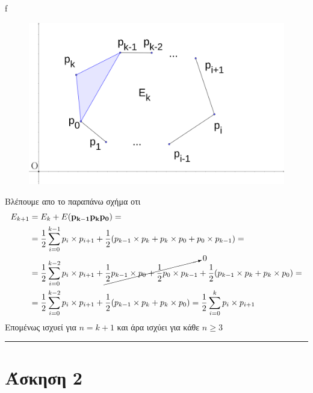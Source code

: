 f\documentclass[12pt]{article}
\begin{document}
\begin{figure}[H]

    \centering
    \includegraphics[scale = 1]{geogebra-export4.png}
\end{figure}
Βλέπουμε απο το παραπάνω σχήμα οτι 
\begin{align*}
    E_{k+1} &= E_k + E({\bf p_{k-1}p_{k}p_0}) =\\
    &=  \frac{1}{2}\sum_{i=0}^{k-1} p_i\times p_{i+1} + \frac{1}{2} (p_{k-1}\times p_{k} + p_{k}\times p_{0} + p_0\times p_{k-1}) = \\
    &=  \frac{1}{2}\sum_{i=0}^{k-2} p_i\times p_{i+1} + \cancelto{0}{\frac{1}{2}p_{k-1}\times p_{0}+ \frac{1}{2}p_0\times p_{k-1}}+\frac{1}{2} (p_{k-1}\times p_{k} + p_{k}\times p_{0} ) = \\
    &=  \frac{1}{2}\sum_{i=0}^{k-2} p_i\times p_{i+1}+\frac{1}{2} (p_{k-1}\times p_{k} + p_{k}\times p_{0} ) =\frac{1}{2}\sum_{i=0}^{k} p_i\times p_{i+1}
\end{align*}
Επομένως ισχυεί για $n=k+1$ και άρα ισχύει για κάθε $n\geq 3$\\
\rule{\textwidth}{.5pt}
\section*{Άσκηση 2}
\end{document}
